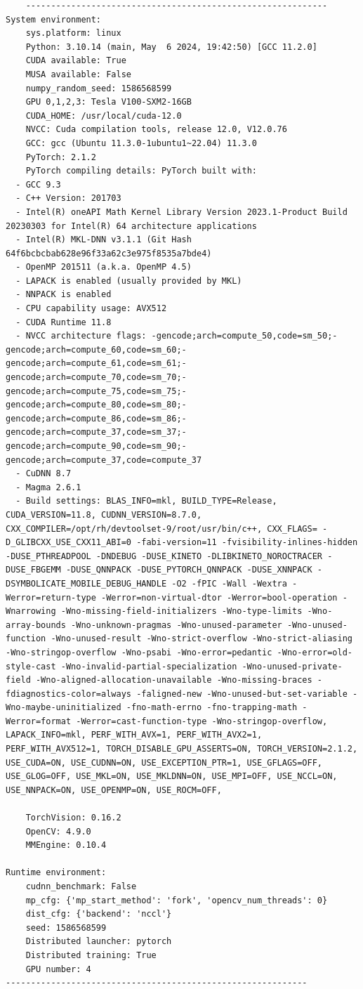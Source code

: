\documentclass[notitlepage,cs4size,punct,oneside]{ctexrep}
\numberwithin{equation}{chapter}
\theoremstyle{mystyle}
\begin{document}
\begin{lstlisting}
    ------------------------------------------------------------
System environment:
    sys.platform: linux
    Python: 3.10.14 (main, May  6 2024, 19:42:50) [GCC 11.2.0]
    CUDA available: True
    MUSA available: False
    numpy_random_seed: 1586568599
    GPU 0,1,2,3: Tesla V100-SXM2-16GB
    CUDA_HOME: /usr/local/cuda-12.0
    NVCC: Cuda compilation tools, release 12.0, V12.0.76
    GCC: gcc (Ubuntu 11.3.0-1ubuntu1~22.04) 11.3.0
    PyTorch: 2.1.2
    PyTorch compiling details: PyTorch built with:
  - GCC 9.3
  - C++ Version: 201703
  - Intel(R) oneAPI Math Kernel Library Version 2023.1-Product Build 20230303 for Intel(R) 64 architecture applications
  - Intel(R) MKL-DNN v3.1.1 (Git Hash 64f6bcbcbab628e96f33a62c3e975f8535a7bde4)
  - OpenMP 201511 (a.k.a. OpenMP 4.5)
  - LAPACK is enabled (usually provided by MKL)
  - NNPACK is enabled
  - CPU capability usage: AVX512
  - CUDA Runtime 11.8
  - NVCC architecture flags: -gencode;arch=compute_50,code=sm_50;-gencode;arch=compute_60,code=sm_60;-gencode;arch=compute_61,code=sm_61;-gencode;arch=compute_70,code=sm_70;-gencode;arch=compute_75,code=sm_75;-gencode;arch=compute_80,code=sm_80;-gencode;arch=compute_86,code=sm_86;-gencode;arch=compute_37,code=sm_37;-gencode;arch=compute_90,code=sm_90;-gencode;arch=compute_37,code=compute_37
  - CuDNN 8.7
  - Magma 2.6.1
  - Build settings: BLAS_INFO=mkl, BUILD_TYPE=Release, CUDA_VERSION=11.8, CUDNN_VERSION=8.7.0, CXX_COMPILER=/opt/rh/devtoolset-9/root/usr/bin/c++, CXX_FLAGS= -D_GLIBCXX_USE_CXX11_ABI=0 -fabi-version=11 -fvisibility-inlines-hidden -DUSE_PTHREADPOOL -DNDEBUG -DUSE_KINETO -DLIBKINETO_NOROCTRACER -DUSE_FBGEMM -DUSE_QNNPACK -DUSE_PYTORCH_QNNPACK -DUSE_XNNPACK -DSYMBOLICATE_MOBILE_DEBUG_HANDLE -O2 -fPIC -Wall -Wextra -Werror=return-type -Werror=non-virtual-dtor -Werror=bool-operation -Wnarrowing -Wno-missing-field-initializers -Wno-type-limits -Wno-array-bounds -Wno-unknown-pragmas -Wno-unused-parameter -Wno-unused-function -Wno-unused-result -Wno-strict-overflow -Wno-strict-aliasing -Wno-stringop-overflow -Wno-psabi -Wno-error=pedantic -Wno-error=old-style-cast -Wno-invalid-partial-specialization -Wno-unused-private-field -Wno-aligned-allocation-unavailable -Wno-missing-braces -fdiagnostics-color=always -faligned-new -Wno-unused-but-set-variable -Wno-maybe-uninitialized -fno-math-errno -fno-trapping-math -Werror=format -Werror=cast-function-type -Wno-stringop-overflow, LAPACK_INFO=mkl, PERF_WITH_AVX=1, PERF_WITH_AVX2=1, PERF_WITH_AVX512=1, TORCH_DISABLE_GPU_ASSERTS=ON, TORCH_VERSION=2.1.2, USE_CUDA=ON, USE_CUDNN=ON, USE_EXCEPTION_PTR=1, USE_GFLAGS=OFF, USE_GLOG=OFF, USE_MKL=ON, USE_MKLDNN=ON, USE_MPI=OFF, USE_NCCL=ON, USE_NNPACK=ON, USE_OPENMP=ON, USE_ROCM=OFF,

    TorchVision: 0.16.2
    OpenCV: 4.9.0
    MMEngine: 0.10.4

Runtime environment:
    cudnn_benchmark: False
    mp_cfg: {'mp_start_method': 'fork', 'opencv_num_threads': 0}
    dist_cfg: {'backend': 'nccl'}
    seed: 1586568599
    Distributed launcher: pytorch
    Distributed training: True
    GPU number: 4
------------------------------------------------------------
\end{lstlisting}
\end{document}
